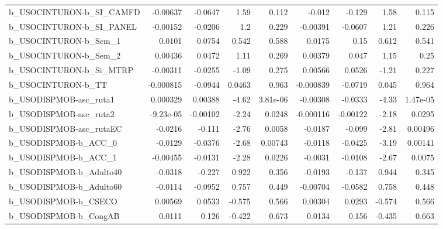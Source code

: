 \begin{tabular}{lrrrrrrrr}
b\_USOCINTURON-b\_SI\_CAMFD   &    -0.00637 &      -0.0647 &      1.59 &    0.112 &     -0.012 &      -0.129 &         1.58 &         0.115 \\
b\_USOCINTURON-b\_SI\_PANEL   &    -0.00152 &      -0.0206 &       1.2 &    0.229 &   -0.00391 &     -0.0607 &         1.21 &         0.226 \\
b\_USOCINTURON-b\_Sem\_1      &      0.0101 &       0.0754 &     0.542 &    0.588 &     0.0175 &        0.15 &        0.612 &         0.541 \\
b\_USOCINTURON-b\_Sem\_2      &     0.00436 &       0.0472 &      1.11 &    0.269 &    0.00379 &       0.047 &         1.15 &          0.25 \\
b\_USOCINTURON-b\_Si\_MTRP    &    -0.00311 &      -0.0255 &     -1.09 &    0.275 &    0.00566 &      0.0526 &        -1.21 &         0.227 \\
b\_USOCINTURON-b\_TT         &   -0.000815 &      -0.0944 &    0.0463 &    0.963 &  -0.000839 &     -0.0719 &        0.045 &         0.964 \\
b\_USODISPMOB-asc\_ruta1     &    0.000329 &      0.00388 &     -4.62 & 3.81e-06 &   -0.00308 &     -0.0333 &        -4.33 &      1.47e-05 \\
b\_USODISPMOB-asc\_ruta2     &   -9.23e-05 &     -0.00102 &     -2.24 &   0.0248 &  -0.000116 &    -0.00122 &        -2.18 &        0.0295 \\
b\_USODISPMOB-asc\_rutaEC    &     -0.0216 &       -0.111 &     -2.76 &   0.0058 &    -0.0187 &      -0.099 &        -2.81 &       0.00496 \\
b\_USODISPMOB-b\_ACC\_0       &     -0.0129 &      -0.0376 &     -2.68 &  0.00743 &    -0.0118 &     -0.0425 &        -3.19 &       0.00141 \\
b\_USODISPMOB-b\_ACC\_1       &    -0.00455 &      -0.0131 &     -2.28 &   0.0226 &    -0.0031 &     -0.0108 &        -2.67 &        0.0075 \\
b\_USODISPMOB-b\_Adulto40    &     -0.0318 &       -0.227 &     0.922 &    0.356 &    -0.0193 &      -0.137 &        0.944 &         0.345 \\
b\_USODISPMOB-b\_Adulto60    &     -0.0114 &      -0.0952 &     0.757 &    0.449 &   -0.00704 &     -0.0582 &        0.758 &         0.448 \\
b\_USODISPMOB-b\_CSECO       &     0.00569 &       0.0533 &    -0.575 &    0.566 &    0.00304 &      0.0293 &       -0.574 &         0.566 \\
b\_USODISPMOB-b\_CongAB      &      0.0111 &        0.126 &    -0.422 &    0.673 &     0.0134 &       0.156 &       -0.435 &         0.663 \\

\end{tabular}
